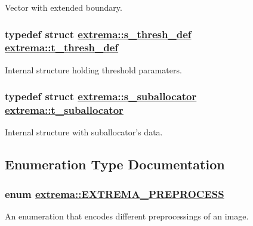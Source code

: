 Vector with extended boundary. 

\hypertarget{namespaceextrema_b3ce6de2e321e3b4f1f4fe1fa89911ce}{
\subsubsection[t\_\-thresh\_\-def]{\setlength{\rightskip}{0pt plus 5cm}typedef struct \hyperlink{structextrema_1_1s__thresh__def}{extrema::s\_\-thresh\_\-def}  \hyperlink{structextrema_1_1s__thresh__def}{extrema::t\_\-thresh\_\-def}}}
\label{namespaceextrema_b3ce6de2e321e3b4f1f4fe1fa89911ce}


Internal structure holding threshold paramaters. 

\hypertarget{namespaceextrema_6be19e858e73efb5002c6ee94bba43fb}{
\subsubsection[t\_\-suballocator]{\setlength{\rightskip}{0pt plus 5cm}typedef struct \hyperlink{structextrema_1_1s__suballocator}{extrema::s\_\-suballocator}  \hyperlink{structextrema_1_1s__suballocator}{extrema::t\_\-suballocator}}}
\label{namespaceextrema_6be19e858e73efb5002c6ee94bba43fb}


Internal structure with suballocator's data. 



\subsection{Enumeration Type Documentation}
\hypertarget{namespaceextrema_837b46455687e9080322d02a03574dab}{
\subsubsection[EXTREMA\_\-PREPROCESS]{\setlength{\rightskip}{0pt plus 5cm}enum \hyperlink{namespaceextrema_837b46455687e9080322d02a03574dab}{extrema::EXTREMA\_\-PREPROCESS}}}
\label{namespaceextrema_837b46455687e9080322d02a03574dab}


An enumeration that encodes different preprocessings of an image. 


